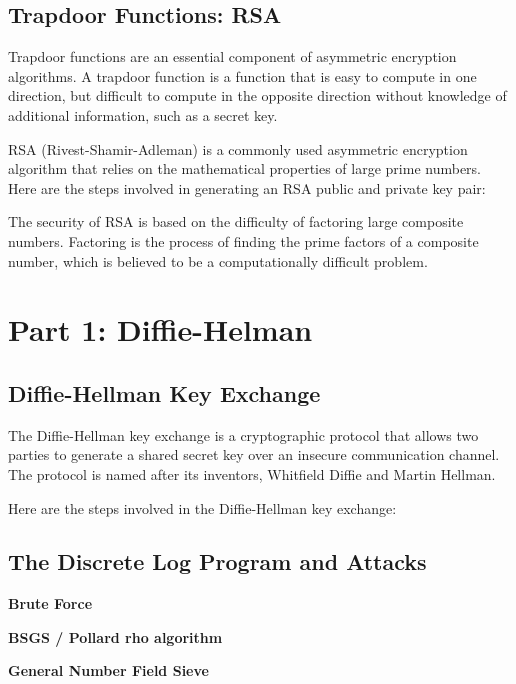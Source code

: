 \documentclass{article}
\begin{document}
\subsection*{Trapdoor Functions: RSA}

Trapdoor functions are an essential component of asymmetric encryption algorithms. A trapdoor function is a function that is easy to compute in one direction, but difficult to compute in the opposite direction without knowledge of additional information, such as a secret key.

RSA (Rivest-Shamir-Adleman) is a commonly used asymmetric encryption algorithm that relies on the mathematical properties of large prime numbers. Here are the steps involved in generating an RSA public and private key pair:

The security of RSA is based on the difficulty of factoring large composite numbers. Factoring is the process of finding the prime factors of a composite number, which is believed to be a computationally difficult problem.

\section*{Part 1: Diffie-Helman}

\subsection*{Diffie-Hellman Key Exchange}

The Diffie-Hellman key exchange is a cryptographic protocol that allows two parties to generate a shared secret key over an insecure communication channel. The protocol is named after its inventors, Whitfield Diffie and Martin Hellman.

Here are the steps involved in the Diffie-Hellman key exchange:

\subsection{The Discrete Log Program and Attacks}

\begin{center}
    \textbf{Brute Force}
\end{center}

\begin{center}
    \textbf{BSGS / Pollard rho algorithm}
\end{center}

\begin{center}
    \textbf{General Number Field Sieve}
\end{center}
\end{document}

